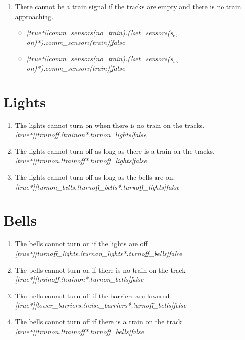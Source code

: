 \documentclass[final]{report}
\begin{document}
\begin{enumerate}
\item There cannot be a train signal if the tracks are empty and there is no train approaching.
\begin{itemize}
\item \textit{[true*][comm\_sensors(no\_train).(!set\_sensors(s$_{e}$, on)*).comm\_sensors(train)]false}
\item \textit{[true*][comm\_sensors(no\_train).(!set\_sensors(s$_{w}$, on)*).comm\_sensors(train)]false}
\end{itemize}

\end{enumerate}
\section{Lights}

\begin{enumerate}
\item The lights cannot turn on when there is no train on the tracks.\\
\textit{[true*][trainoff.!trainon*.turnon\_lights]false}

\item The lights cannot turn off as long as there is a train on the tracks.\\
\textit{[true*][trainon.!trainoff*.turnoff\_lights]false}

\item The lights cannot turn off as long as the bells are on.\\
\textit{[true*][turnon\_bells.!turnoff\_bells*.turnoff\_lights]false}
\end{enumerate}

\section{Bells}
\begin{enumerate}
\item The bells cannot turn on if the lights are off\\
\textit{[true*][turnoff\_lights.!turnon\_lights*.turnoff\_bells]false}
\item The bells cannot turn on if there is no train on the track\\
\textit{[true*][trainoff.!trainon*.turnon\_bells]false}
\item The bells cannot turn off if the barriers are lowered\\
\textit{[true*][lower\_barriers.!raise\_barriers*.turnoff\_bells]false}
\item The bells cannot turn off if there is a train on the track\\
\textit{[true*][trainon.!trainoff*.turnoff\_bells]false}
\end{enumerate}
\end{document}
